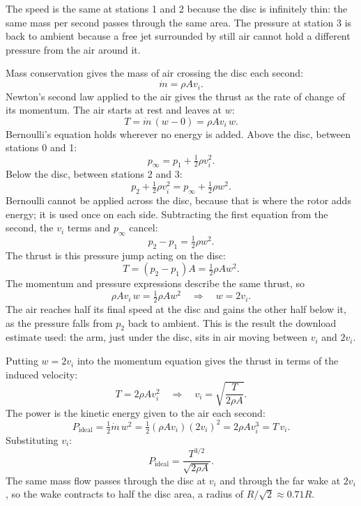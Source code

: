 The speed is the same at stations 1 and 2 because the disc is infinitely thin: the same mass per second passes through the same area. The pressure at station 3 is back to ambient because a free jet surrounded by still air cannot hold a different pressure from the air around it.

Mass conservation gives the mass of air crossing the disc each second:
\begin{equation}
\dot m = \rho A v_i.
\end{equation}
Newton's second law applied to the air gives the thrust as the rate of change of its momentum. The air starts at rest and leaves at $w$:
\begin{equation}
T = \dot m\,(w - 0) = \rho A v_i\, w.
\end{equation}
Bernoulli's equation holds wherever no energy is added. Above the disc, between stations 0 and 1:
\begin{equation}
p_\infty = p_1 + \tfrac12 \rho v_i^2.
\end{equation}
Below the disc, between stations 2 and 3:
\begin{equation}
p_2 + \tfrac12 \rho v_i^2 = p_\infty + \tfrac12 \rho w^2.
\end{equation}
Bernoulli cannot be applied across the disc, because that is where the rotor adds energy; it is used once on each side. Subtracting the first equation from the second, the $v_i$ terms and $p_\infty$ cancel:
\begin{equation}
p_2 - p_1 = \tfrac12 \rho w^2.
\end{equation}
The thrust is this pressure jump acting on the disc:
\begin{equation}
T = (p_2 - p_1)A = \tfrac12 \rho A w^2.
\end{equation}
The momentum and pressure expressions describe the same thrust, so
\begin{equation}
\rho A v_i\, w = \tfrac12 \rho A w^2 \quad\Rightarrow\quad w = 2v_i.
\end{equation}
The air reaches half its final speed at the disc and gains the other half below it, as the pressure falls from $p_2$ back to ambient. This is the result the download estimate used: the arm, just under the disc, sits in air moving between $v_i$ and $2v_i$.

Putting $w = 2v_i$ into the momentum equation gives the thrust in terms of the induced velocity:
\begin{equation}
T = 2\rho A v_i^2 \quad\Rightarrow\quad v_i = \sqrt{\frac{T}{2\rho A}}.
\end{equation}
The power is the kinetic energy given to the air each second:
\begin{equation}
P_\text{ideal} = \tfrac12 \dot m\, w^2 = \tfrac12 (\rho A v_i)(2v_i)^2 = 2\rho A v_i^3 = T\, v_i.
\end{equation}
Substituting $v_i$:
\begin{equation}
P_\text{ideal} = \frac{T^{3/2}}{\sqrt{2\rho A}}.
\end{equation}
The same mass flow passes through the disc at $v_i$ and through the far wake at $2v_i$, so the wake contracts to half the disc area, a radius of $R/\sqrt2 \approx 0.71R$.

